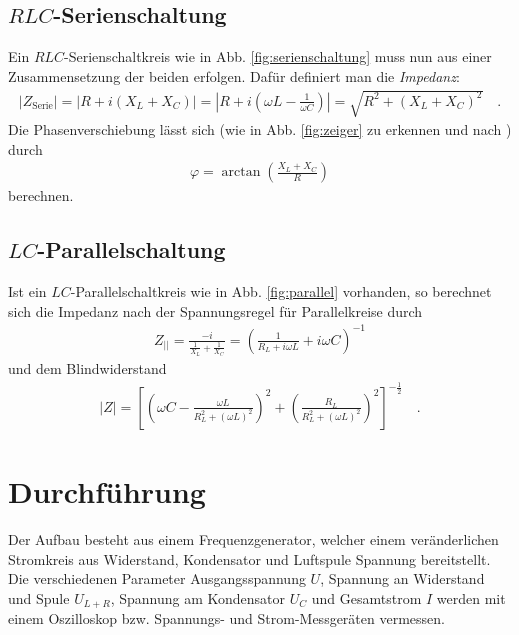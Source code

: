 \documentclass[12pt,a4paper,titlepage,headinclude,bibtotoc]{scrartcl}
\begin{document}
\subsection{$RLC$-Serienschaltung}
\label{sec:RLC}
Ein $RLC$-Serienschaltkreis wie in Abb. \ref{fig:serienschaltung} muss nun aus einer Zusammensetzung der beiden erfolgen.
Dafür definiert man die \emph{Impedanz}:
\begin{align}
|Z_\text{Serie}|=\left|R+i(X_L+X_C)\right|=\left|R+i\left( \omega L-\frac{1}{\omega C} \right)\right|=\sqrt{R^2+(X_L+X_C)^2}\quad .
\label{eq:ZSerie}
\end{align}
Die Phasenverschiebung lässt sich (wie in Abb. \ref{fig:zeiger} zu erkennen und nach \cite[S. 1042]{giancoli}) durch
\begin{align}
\varphi=\arctan\left( \frac{X_L+X_C}{R} \right)
\label{eq:PhaseSerie}
\end{align}
berechnen.

\subsection{$LC$-Parallelschaltung}
\label{sec:LC}
Ist ein $LC$-Parallelschaltkreis wie in Abb. \ref{fig:parallel} vorhanden, so berechnet sich die Impedanz nach der Spannungsregel für Parallelkreise durch
\begin{align}
Z_{||}=\frac{-i}{\frac{1}{X_L}+\frac{1}{X_C}}=\left( \frac{1}{R_L+i\omega L}+i\omega C \right)^{-1}
\end{align}
und dem Blindwiderstand
\begin{align}
|Z|=\left[\left(\omega C - \frac{\omega L}{R_L^2+(\omega L)^2}\right)^2+\left(\frac{R_L}{R_L^2+(\omega L)^2}\right)^2\right]^{-\frac{1}{2}}\label{eq:ZPara}\quad .
\end{align}
\section{Durchführung}
\label{sec:durchfuehrung}
Der Aufbau besteht aus einem Frequenzgenerator, welcher einem veränderlichen Stromkreis aus Widerstand, Kondensator und Luftspule Spannung bereitstellt.
Die verschiedenen Parameter Ausgangsspannung $U$, Spannung an Widerstand und Spule $U_{L+R}$, Spannung am Kondensator $U_C$ und Gesamtstrom $I$ werden mit einem Oszilloskop bzw. Spannungs- und Strom-Messgeräten vermessen.\\
\end{document}
